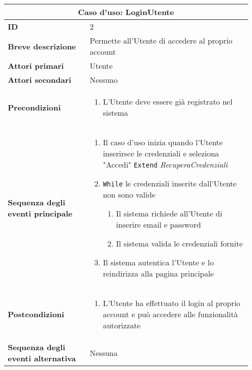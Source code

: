 \documentclass[a4paper]{report}
\begin{document}
\clearpage
\begin{table}[H]
\vspace*{-0cm}
\renewcommand{\arraystretch}{1.9}
\begin{tabular}{|p{3.9cm}|p{9.9cm}|}
\hline
\multicolumn{2}{|c|}{\textbf{Caso d’uso: LoginUtente}} \\ \hline
\textbf{ID} & 2 \\ \hline
\textbf{Breve descrizione} &  Permette all’Utente di accedere al proprio account\\ \hline
\textbf{Attori primari} & Utente \\ \hline
\textbf{Attori secondari} & Nessuno \\ \hline
\textbf{Precondizioni} & \begin{enumerate}[leftmargin=14pt,label=\arabic*.,labelsep=0.5em,topsep=0pt,partopsep=0pt,parsep=0pt,itemsep=0pt]
    \item L’Utente deve essere già registrato nel sistema 
\end{enumerate}\\ \hline
\textbf{Sequenza degli eventi principale} & \begin{enumerate}[leftmargin=14pt,label=\arabic*.,labelsep=0.5em,topsep=0pt,partopsep=0pt,parsep=0pt,itemsep=0pt]
    \item Il caso d’uso inizia quando l’Utente inserirsce le credenziali e seleziona "Accedi" \newline \texttt{Extend} \textit{RecuperaCredenziali}
    \item \texttt{While} le credenziali inserite dall’Utente non sono valide
    \begin{enumerate}[label=\arabic{enumi}.\arabic*.,leftmargin=22pt,labelsep=0.5em,topsep=0pt,partopsep=0pt,parsep=0pt,itemsep=0pt]
        \item Il sistema richiede all’Utente di inserire email e password
        \item Il sistema valida le credenziali fornite
    \end{enumerate}
    \item Il sistema autentica l’Utente e lo reindirizza alla pagina principale
\end{enumerate}\\ \hline
\textbf{Postcondizioni} & \begin{enumerate}[leftmargin=14pt,label=\arabic*.,labelsep=0.5em,topsep=0pt,partopsep=0pt,parsep=0pt,itemsep=0pt]
    \item L’Utente ha effettuato il login al proprio account e può accedere alle funzionalità autorizzate
    \end{enumerate} \\ \hline
\textbf{Sequenza degli eventi alternativa} & Nessuna \\ \hline
\end{tabular}
\end{table}
\end{document}
